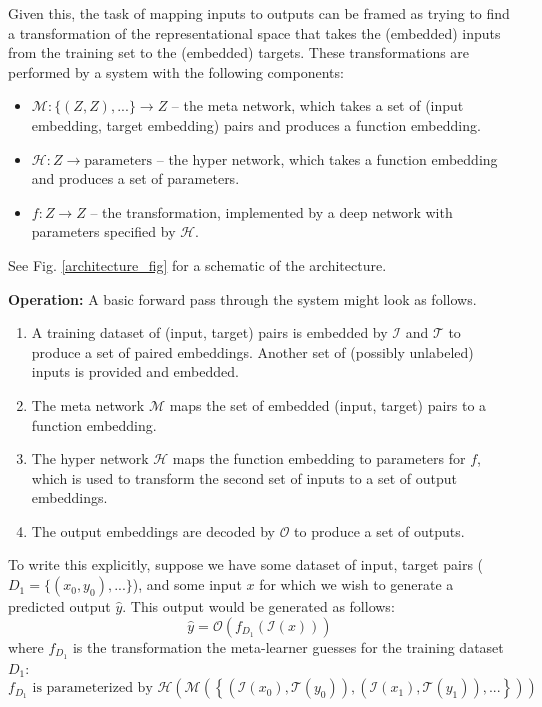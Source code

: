 \documentclass[11pt]{article}
\begin{document}
Given this, the task of mapping inputs to outputs can be framed as trying to find a transformation of the representational space that takes the (embedded) inputs from the training set to the (embedded) targets. These transformations are performed by a system with the following components:
\begin{itemize}
\item $\mathcal{M}: \{(Z, Z), ...\} \rightarrow Z $ -- the meta network, which takes a set of (input embedding, target embedding) pairs and produces a function embedding.
\item $\mathcal{H}: Z \rightarrow \text{parameters}$ -- the hyper network, which takes a function embedding and produces a set of parameters.
\item $f: Z \rightarrow Z$ -- the transformation, implemented by a deep network with parameters specified by $\mathcal{H}$.
\end{itemize}
See Fig. \ref{architecture_fig} for a schematic of the architecture. \par
\textbf{Operation:} A basic forward pass through the system might look as follows.
\begin{enumerate}
\item A training dataset of (input, target) pairs is embedded by $\mathcal{I}$ and $\mathcal{T}$ to produce a set of paired embeddings. Another set of (possibly unlabeled) inputs is provided and embedded.
\item The meta network $\mathcal{M}$ maps the set of embedded (input, target) pairs to a function embedding.
\item The hyper network $\mathcal{H}$ maps the function embedding to parameters for $f$, which is used to transform the second set of inputs to a set of output embeddings.
\item The output embeddings are decoded by $\mathcal{O}$ to produce a set of outputs.
\end{enumerate}
To write this explicitly, suppose we have some dataset of input, target pairs ($D_1 = \{(x_0, y_0), ...\}$), and some input $x$ for which we wish to generate a predicted output $\hat{y}$. This output would be generated as follows:
$$\hat{y} = \mathcal{O}\left(f_{D_1}\left(\mathcal{I} \left(x\right)\right) \right)$$
where $f_{D_1}$ is the transformation the meta-learner guesses for the training dataset $D_1$:
$$f_{D_1} \text{ is parameterized by } \mathcal{H}\left(\mathcal{M}\left( \left\{\left(\mathcal{I}\left(x_0\right), \mathcal{T}\left(y_0\right) \right), \left(\mathcal{I}\left(x_1\right), \mathcal{T}\left(y_1\right) \right), ... \right\}\right)\right)$$
\end{document}
